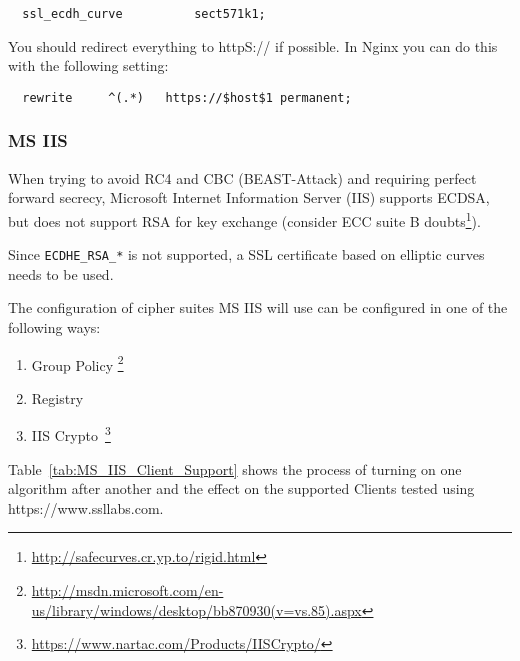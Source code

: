 \begin{verbatim}
  ssl_ecdh_curve          sect571k1;
\end{verbatim}

You should redirect everything to httpS:// if possible. In Nginx you can do this with the following setting:

\begin{verbatim}
  rewrite     ^(.*)   https://$host$1 permanent;
\end{verbatim}



\subsubsection{MS IIS}
\label{sec:ms-iis}



When trying to avoid RC4 and CBC (BEAST-Attack) and requiring perfect
forward secrecy, Microsoft Internet Information Server (IIS) supports
ECDSA, but does not support RSA for key exchange (consider ECC suite
B doubts\footnote{\url{http://safecurves.cr.yp.to/rigid.html}}).

Since \verb|ECDHE_RSA_*| is not supported, a SSL certificate based on
elliptic curves needs to be used.

The configuration of cipher suites MS IIS will use can be configured in one
of the following ways:
\begin{enumerate}
\item Group Policy \footnote{\url{http://msdn.microsoft.com/en-us/library/windows/desktop/bb870930(v=vs.85).aspx}}
\item Registry
\item IIS Crypto~\footnote{\url{https://www.nartac.com/Products/IISCrypto/}}
\end{enumerate}


Table~\ref{tab:MS_IIS_Client_Support} shows the process of turning on
one algorithm after another and the effect on the supported Clients
tested using https://www.ssllabs.com.

